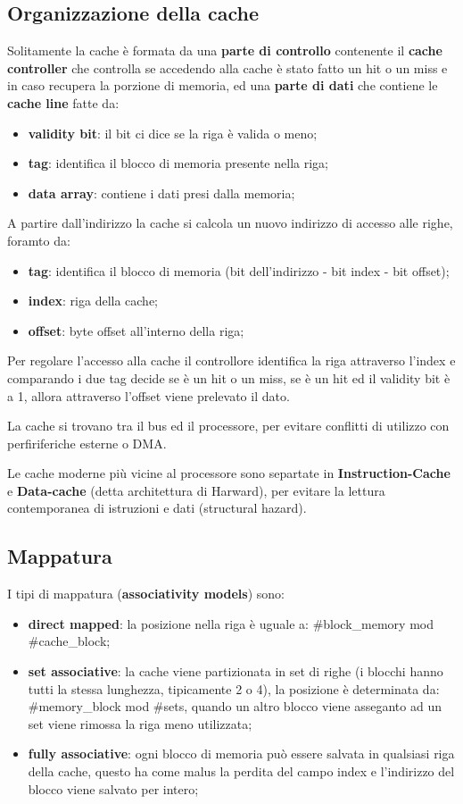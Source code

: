 \documentclass[12pt]{article}
\begin{document}
\subsection{Organizzazione della cache}
Solitamente la cache \`e formata da una \textbf{parte di controllo} contenente il \textbf{cache controller} che controlla se accedendo alla cache \`e stato fatto un hit o un miss e in caso recupera la porzione di memoria, ed una \textbf{parte di dati} che contiene le \textbf{cache line} fatte da:
\begin{itemize}
    \item \textbf{validity bit}: il bit ci dice se la riga \`e valida o meno;
    \item \textbf{tag}: identifica il blocco di memoria presente nella riga;
    \item \textbf{data array}: contiene i dati presi dalla memoria;
\end{itemize}
A partire dall'indirizzo la cache si calcola un nuovo indirizzo di accesso alle righe, foramto da:
\begin{itemize}
    \item \textbf{tag}: identifica il blocco di memoria (bit dell'indirizzo - bit index - bit offset);
    \item \textbf{index}: riga della cache;
    \item \textbf{offset}: byte offset all'interno della riga;
\end{itemize}
Per regolare l'accesso alla cache il controllore identifica la riga attraverso l'index e comparando i due tag decide se \`e un hit o un miss, se \`e un hit ed il validity bit \`e a 1, allora attraverso l'offset viene prelevato il dato.

La cache si trovano tra il bus ed il processore, per evitare conflitti di utilizzo con perfiriferiche esterne o DMA.

Le cache moderne pi\`u vicine al processore sono separtate in \textbf{Instruction-Cache} e \textbf{Data-cache} (detta architettura di Harward), per evitare la lettura contemporanea di istruzioni e dati (structural hazard).

\subsection{Mappatura}
I tipi di mappatura (\textbf{associativity models}) sono:
\begin{itemize}
    \item \textbf{direct mapped}: la posizione nella riga \`e uguale a: \#block\_memory mod \#cache\_block;
    \item \textbf{set associative}: la cache viene partizionata in set di righe (i blocchi hanno tutti la stessa lunghezza, tipicamente 2 o 4), la posizione \`e determinata da: \#memory\_block mod \#sets, quando un altro blocco viene asseganto ad un set viene rimossa la riga meno utilizzata;
    \item \textbf{fully associative}: ogni blocco di memoria pu\`o essere salvata in qualsiasi riga della cache, questo ha come malus la perdita del campo index e l'indirizzo del blocco viene salvato per intero;
\end{itemize}
\end{document}
